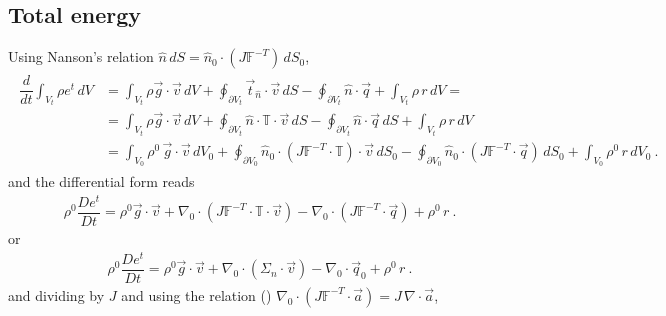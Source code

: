 \documentclass[letterpaper,10pt,english]{jupyterBook}
\begin{document}
\subsection{Total energy}
\label{\detokenize{ch/continuum/balance-reference-integral:total-energy}}\label{\detokenize{ch/continuum/balance-reference-integral:continuum-governing-equations-reference-integral-total-energy}}
\sphinxAtStartPar
Using Nanson’s relation \(\hat{n} \, dS = \hat{n}_0 \cdot \left(J \mathbb{F}^{-T}\right) \, d S_0\),
\begin{equation*}
\begin{split}\begin{aligned}
  \dfrac{d}{d t} \int_{V_t} \rho e^t \, dV
  & = \int_{V_t} \rho \vec{g} \cdot \vec{v} \, dV + \oint_{\partial V_t} \vec{t}_{\hat{n}} \cdot \vec{v}  \, dS - \oint_{\partial V_t} \hat{n} \cdot \vec{q} + \int_{V_t} \rho \, r \, dV = \\
  & = \int_{V_t} \rho \vec{g} \cdot \vec{v} \, dV + \oint_{\partial V_t} \hat{n} \cdot \mathbb{T} \cdot \vec{v} \, dS - \oint_{\partial V_t} \hat{n} \cdot \vec{q} \, dS + \int_{V_t} \rho \, r \, dV \\
  & = \int_{V_0} \rho^0 \, \vec{g} \cdot \vec{v} \, dV_0 + \oint_{\partial V_0} \hat{n}_0 \cdot \left( J \mathbb{F}^{-T} \cdot \mathbb{T} \right) \cdot \vec{v} \, dS_0 - \oint_{\partial V_0} \hat{n}_0 \cdot \left( J \mathbb{F}^{-T} \cdot \vec{q} \right) \, dS_0 + \int_{V_0} \rho^0 \, r \, dV_0 \ .
\end{aligned}\end{split}
\end{equation*}
\sphinxAtStartPar
and the differential form reads
\begin{equation*}
\begin{split}
\rho^0 \dfrac{D e^t}{Dt} = \rho^0 \vec{g} \cdot \vec{v} + \nabla_0 \cdot \left( J \mathbb{F}^{-T} \cdot \mathbb{T} \cdot \vec{v} \right) - \nabla_0 \cdot \left( J \mathbb{F}^{-T} \cdot \vec{q} \right) + \rho^0 \, r \ .
\end{split}
\end{equation*}
\sphinxAtStartPar
or
\begin{equation*}
\begin{split}
\rho^0 \dfrac{D e^t}{Dt} = \rho^0 \vec{g} \cdot \vec{v} + \nabla_0 \cdot \left( \mathbb{\Sigma}_n \cdot \vec{v} \right) - \nabla_0 \cdot \vec{q}_0 + \rho^0 \, r \ .
\end{split}
\end{equation*}
\sphinxAtStartPar
and dividing by \(J\) and using the relation () \(\nabla_0 \cdot ( J \mathbb{F}^{-T} \cdot \vec{a} ) = J \, \nabla \cdot \vec{a}\),
\end{document}
